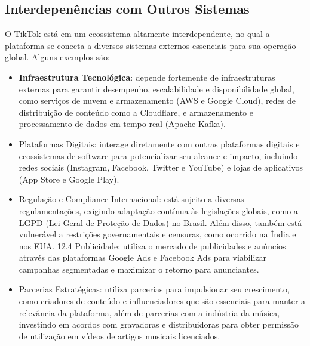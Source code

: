 \subsection{Interdepenências com Outros Sistemas}

O TikTok está em um ecossistema altamente interdependente, no qual a plataforma se conecta a diversos sistemas externos essenciais para sua operação global. Alguns exemplos são:

\begin{itemize}
\item \textbf{Infraestrutura Tecnológica}: depende fortemente de infraestruturas externas para garantir desempenho, escalabilidade e disponibilidade global, como serviços de nuvem e armazenamento (AWS e Google Cloud), redes de distribuição de conteúdo como a Cloudflare, e armazenamento e processamento de dados em tempo real (Apache Kafka).

\item Plataformas Digitais: interage diretamente com outras plataformas digitais e ecossistemas de software para potencializar seu alcance e impacto, incluindo redes sociais (Instagram, Facebook, Twitter e YouTube) e lojas de aplicativos (App Store e Google Play).

\item Regulação e Compliance Internacional: está sujeito a diversas regulamentações, exigindo adaptação contínua às legislações globais, como a LGPD (Lei Geral de Proteção de Dados) no Brasil. Além disso, também está vulnerável a restrições governamentais e censuras, como ocorrido na Índia e nos EUA.
12.4 Publicidade: utiliza o mercado de publicidades e anúncios através das plataformas Google Ads e Facebook Ads para viabilizar campanhas segmentadas e maximizar o retorno para anunciantes.

\item Parcerias Estratégicas: utiliza parcerias para impulsionar seu crescimento, como criadores de conteúdo e influenciadores que são essenciais para manter a relevância da plataforma, além de parcerias com a indústria da música, investindo em acordos com gravadoras e distribuidoras para obter permissão de utilização em vídeos de artigos musicais licenciados.
\end{itemize}